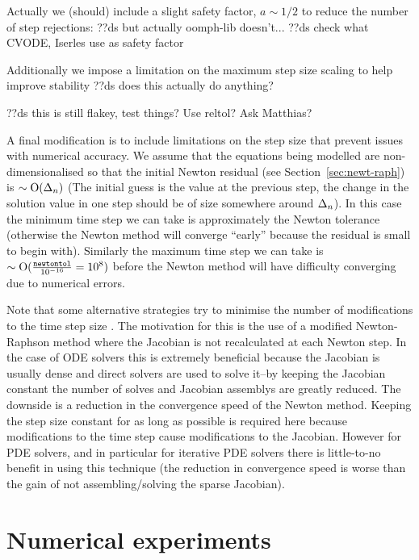 Actually we (should) include a slight safety factor, $a \sim 1/2$ to reduce the number of step rejections:
??ds but actually oomph-lib doesn't...
??ds check what CVODE, Iserles use as safety factor


Additionally we impose a limitation on the maximum step size scaling to help improve stability ??ds does this actually do anything?


??ds this is still flakey, test things? Use reltol? Ask Matthias?

A final modification is to include limitations on the step size that prevent issues with numerical accuracy.
We assume that the equations being modelled are non-dimensionalised so that the initial Newton residual (see Section~\ref{sec:newt-raph}) is $\sim \text{O}(\Delta_{n})$ (The initial guess is the value at the previous step, the change in the solution value in one step should be of size somewhere around $\Delta_{n}$).
In this case the minimum time step we can take is approximately the Newton tolerance (otherwise the Newton method will converge ``early'' because the residual is small to begin with).
Similarly the maximum time step we can take is $\sim \text{O}(\frac{\texttt{newtontol}}{10^{-16}} = 10^{8})$ before the Newton method will have difficulty converging due to numerical errors.


Note that some alternative strategies try to minimise the number of modifications to the time step size \cite[chap. 6]{Iserles2009} \cite[Sec. 2.1]{cvode-manual}.
The motivation for this is the use of a modified Newton-Raphson method where the Jacobian is not recalculated at each Newton step.
In the case of ODE solvers this is extremely beneficial because the Jacobian is usually dense and direct solvers are used to solve it--by keeping the Jacobian constant the number of solves and Jacobian assemblys are greatly reduced.
The downside is a reduction in the convergence speed of the Newton method.
Keeping the step size constant for as long as possible is required here because modifications to the time step cause modifications to the Jacobian.
However for PDE solvers, and in particular for iterative PDE solvers there is little-to-no benefit in using this technique (the reduction in convergence speed is worse than the gain of not assembling/solving the sparse Jacobian)\cite[pg. 128]{Iserles2009}.


\section{Numerical experiments}
\label{sec:aimr-testing}


